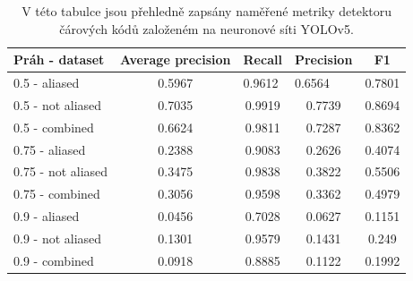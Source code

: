 \begin{table}[ht]
\centering
\begin{tabular}{|l|c|c|c|c|}
\hline
Práh - dataset     & Average precision & Recall  & Precision & F1      \\ \hline
0.5 - aliased & 0.5967 & \multicolumn{1}{l|}{0.9612} & \multicolumn{1}{l|}{0.6564} & \multicolumn{1}{l|}{0.7801} \\ \hline
0.5 - not aliased  & 0.7035          & 0.9919 & 0.7739  & 0.8694 \\ \hline
0.5 - combined     & 0.6624           & 0.9811 & 0.7287    & 0.8362 \\ \hline
0.75 - aliased     & 0.2388             & 0.9083  & 0.2626    & 0.4074  \\ \hline
0.75 - not aliased & 0.3475            & 0.9838 & 0.3822  & 0.5506 \\ \hline
0.75 - combined    & 0.3056            & 0.9598 & 0.3362   & 0.4979  \\ \hline
0.9 - aliased      & 0.0456               & 0.7028     & 0.0627       & 0.1151     \\ \hline
0.9 - not aliased  & 0.1301               & 0.9579     & 0.1431       & 0.249     \\ \hline
0.9 - combined     & 0.0918               & 0.8885     & 0.1122       & 0.1992     \\ \hline
\end{tabular}
\caption{V této tabulce jsou přehledně zapsány naměřené metriky detektoru čárových kódů založeném na neuronové síti YOLOv5.}
\label{yolov5_table}
\end{table}

\pagebreak


